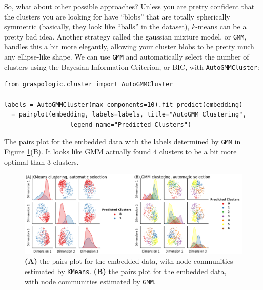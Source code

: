 So, what about other possible approaches? Unless you are pretty confident that the clusters you are looking for have ``blobs'' that are totally spherically symmetric (basically, they look like ``balls'' in the dataset), $k$-means can be a pretty bad idea. Another strategy called the gaussian mixture model, or \texttt{GMM}, handles this a bit more elegantly, allowing your cluster blobs to be pretty much any ellipse-like shape. We can use \texttt{GMM} and automatically select the number of clusters using the Bayesian Information Criterion, or BIC, with \texttt{AutoGMMCluster}:
\begin{lstlisting}[style=python]
from graspologic.cluster import AutoGMMCluster

labels = AutoGMMCluster(max_components=10).fit_predict(embedding)
_ = pairplot(embedding, labels=labels, title="AutoGMM Clustering", 
                  legend_name="Predicted Clusters")
\end{lstlisting}
The pairs plot for the embedded data with the labels determined by \texttt{GMM} in Figure \ref{fig:ch2:pairplots_impute}(B). It looks like GMM actually found $4$ clusters to be a bit more optimal than $3$ clusters. 

\begin{figure}
    \centering
    \includegraphics[width=\linewidth]{foundations/ch2/Images/pairplots_impute.png}
    \caption[Comparison of labels estimated by $k$-means and GMM]{\textbf{(A)} the pairs plot for the embedded data, with node communities estimated by \texttt{KMeans}. \textbf{(B)} the pairs plot for the embedded data, with node communities estimated by \texttt{GMM}.}
    \label{fig:ch2:pairplots_impute}
\end{figure}

\newpage